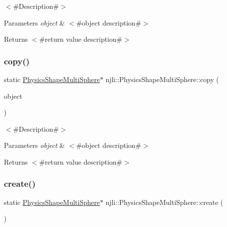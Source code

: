$<$\#\+Description\#$>$


\begin{DoxyParams}{Parameters}
{\em object} & $<$\#object description\#$>$\\
\hline
\end{DoxyParams}
\begin{DoxyReturn}{Returns}
$<$\#return value description\#$>$ 
\end{DoxyReturn}
\mbox{\label{classnjli_1_1_physics_shape_multi_sphere_a64000bc87d83940963e1b323328377c2}} 
\subsubsection{\texorpdfstring{copy()}{copy()}}
{\footnotesize\ttfamily static \mbox{\hyperlink{classnjli_1_1_physics_shape_multi_sphere}{Physics\+Shape\+Multi\+Sphere}}$\ast$ njli\+::\+Physics\+Shape\+Multi\+Sphere\+::copy (\begin{DoxyParamCaption}\item[{const \mbox{\hyperlink{classnjli_1_1_physics_shape_multi_sphere}{Physics\+Shape\+Multi\+Sphere}} \&}]{object }\end{DoxyParamCaption})\hspace{0.3cm}{\ttfamily [static]}}

$<$\#\+Description\#$>$


\begin{DoxyParams}{Parameters}
{\em object} & $<$\#object description\#$>$\\
\hline
\end{DoxyParams}
\begin{DoxyReturn}{Returns}
$<$\#return value description\#$>$ 
\end{DoxyReturn}
\mbox{\label{classnjli_1_1_physics_shape_multi_sphere_a5a3b9657b148c2e4e4ea26c89097c679}} 
\subsubsection{\texorpdfstring{create()}{create()}\hspace{0.1cm}{\footnotesize\ttfamily [1/2]}}
{\footnotesize\ttfamily static \mbox{\hyperlink{classnjli_1_1_physics_shape_multi_sphere}{Physics\+Shape\+Multi\+Sphere}}$\ast$ njli\+::\+Physics\+Shape\+Multi\+Sphere\+::create (\begin{DoxyParamCaption}{ }\end{DoxyParamCaption})\hspace{0.3cm}{\ttfamily [static]}}

